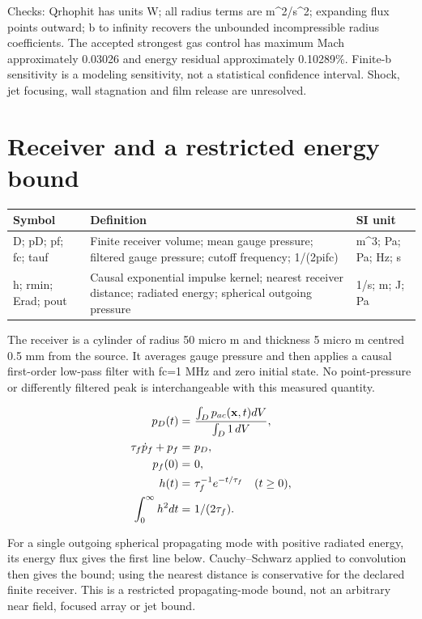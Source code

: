 \documentclass[11pt]{article}
\begin{document}
Checks: Qrhophit has units W; all radius terms are m\textasciicircum{}2/s\textasciicircum{}2; expanding flux points outward; b to infinity recovers the unbounded incompressible radius coefficients. The accepted strongest gas control has maximum Mach approximately 0.03026 and energy residual approximately 0.10289\%. Finite-b sensitivity is a modeling sensitivity, not a statistical confidence interval. Shock, jet focusing, wall stagnation and film release are unresolved.

\section{Receiver and a restricted energy bound}\label{sec:receiver}

\begin{longtable}{p{.18\linewidth}p{.60\linewidth}p{.15\linewidth}}Symbol & Definition & SI unit\\\hline

D; pD; pf; fc; tauf & Finite receiver volume; mean gauge pressure; filtered gauge pressure; cutoff frequency; 1/(2pifc) & m\textasciicircum{}3; Pa; Pa; Hz; s\\

h; rmin; Erad; pout & Causal exponential impulse kernel; nearest receiver distance; radiated energy; spherical outgoing pressure & 1/s; m; J; Pa\\

\end{longtable}

The receiver is a cylinder of radius 50  micro m and thickness 5  micro m centred 0.5 mm from the source. It averages gauge pressure and then applies a causal first-order low-pass filter with fc=1 MHz and zero initial state. No point-pressure or differently filtered peak is interchangeable with this measured quantity.

\begin{align}
p_D(t)= & ~\frac{\int_D p_{ac}(\mathbf x,t)dV}{\int_D1\,dV}, \notag \\
\tau_f\dot p_f+p_f= & ~p_D, \notag \\
p_f(0)= & ~0, \notag \\
h(t)= & ~\tau_f^{-1}e^{-t/\tau_f}\quad(t\ge0), \notag \\
\int_0^\infty h^2dt= & ~1/(2\tau_f). \label{eq:receiver_filter}
\end{align}

For a single outgoing spherical propagating mode with positive radiated energy, its energy flux gives the first line below. Cauchy--Schwarz applied to convolution then gives the bound; using the nearest distance is conservative for the declared finite receiver. This is a restricted propagating-mode bound, not an arbitrary near field, focused array or jet bound.
\end{document}
